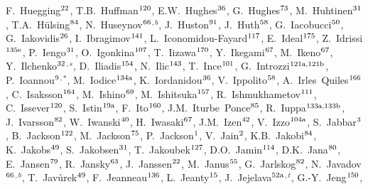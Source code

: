 \begin{flushleft}
F.~Huegging$^\textrm{\scriptsize 22}$,
T.B.~Huffman$^\textrm{\scriptsize 120}$,
E.W.~Hughes$^\textrm{\scriptsize 36}$,
G.~Hughes$^\textrm{\scriptsize 73}$,
M.~Huhtinen$^\textrm{\scriptsize 31}$,
T.A.~H\"ulsing$^\textrm{\scriptsize 84}$,
N.~Huseynov$^\textrm{\scriptsize 66}$$^{,b}$,
J.~Huston$^\textrm{\scriptsize 91}$,
J.~Huth$^\textrm{\scriptsize 58}$,
G.~Iacobucci$^\textrm{\scriptsize 50}$,
G.~Iakovidis$^\textrm{\scriptsize 26}$,
I.~Ibragimov$^\textrm{\scriptsize 141}$,
L.~Iconomidou-Fayard$^\textrm{\scriptsize 117}$,
E.~Ideal$^\textrm{\scriptsize 175}$,
Z.~Idrissi$^\textrm{\scriptsize 135e}$,
P.~Iengo$^\textrm{\scriptsize 31}$,
O.~Igonkina$^\textrm{\scriptsize 107}$,
T.~Iizawa$^\textrm{\scriptsize 170}$,
Y.~Ikegami$^\textrm{\scriptsize 67}$,
M.~Ikeno$^\textrm{\scriptsize 67}$,
Y.~Ilchenko$^\textrm{\scriptsize 32}$$^{,s}$,
D.~Iliadis$^\textrm{\scriptsize 154}$,
N.~Ilic$^\textrm{\scriptsize 143}$,
T.~Ince$^\textrm{\scriptsize 101}$,
G.~Introzzi$^\textrm{\scriptsize 121a,121b}$,
P.~Ioannou$^\textrm{\scriptsize 9}$$^{,*}$,
M.~Iodice$^\textrm{\scriptsize 134a}$,
K.~Iordanidou$^\textrm{\scriptsize 36}$,
V.~Ippolito$^\textrm{\scriptsize 58}$,
A.~Irles~Quiles$^\textrm{\scriptsize 166}$,
C.~Isaksson$^\textrm{\scriptsize 164}$,
M.~Ishino$^\textrm{\scriptsize 69}$,
M.~Ishitsuka$^\textrm{\scriptsize 157}$,
R.~Ishmukhametov$^\textrm{\scriptsize 111}$,
C.~Issever$^\textrm{\scriptsize 120}$,
S.~Istin$^\textrm{\scriptsize 19a}$,
F.~Ito$^\textrm{\scriptsize 160}$,
J.M.~Iturbe~Ponce$^\textrm{\scriptsize 85}$,
R.~Iuppa$^\textrm{\scriptsize 133a,133b}$,
J.~Ivarsson$^\textrm{\scriptsize 82}$,
W.~Iwanski$^\textrm{\scriptsize 40}$,
H.~Iwasaki$^\textrm{\scriptsize 67}$,
J.M.~Izen$^\textrm{\scriptsize 42}$,
V.~Izzo$^\textrm{\scriptsize 104a}$,
S.~Jabbar$^\textrm{\scriptsize 3}$,
B.~Jackson$^\textrm{\scriptsize 122}$,
M.~Jackson$^\textrm{\scriptsize 75}$,
P.~Jackson$^\textrm{\scriptsize 1}$,
V.~Jain$^\textrm{\scriptsize 2}$,
K.B.~Jakobi$^\textrm{\scriptsize 84}$,
K.~Jakobs$^\textrm{\scriptsize 49}$,
S.~Jakobsen$^\textrm{\scriptsize 31}$,
T.~Jakoubek$^\textrm{\scriptsize 127}$,
D.O.~Jamin$^\textrm{\scriptsize 114}$,
D.K.~Jana$^\textrm{\scriptsize 80}$,
E.~Jansen$^\textrm{\scriptsize 79}$,
R.~Jansky$^\textrm{\scriptsize 63}$,
J.~Janssen$^\textrm{\scriptsize 22}$,
M.~Janus$^\textrm{\scriptsize 55}$,
G.~Jarlskog$^\textrm{\scriptsize 82}$,
N.~Javadov$^\textrm{\scriptsize 66}$$^{,b}$,
T.~Jav\r{u}rek$^\textrm{\scriptsize 49}$,
F.~Jeanneau$^\textrm{\scriptsize 136}$,
L.~Jeanty$^\textrm{\scriptsize 15}$,
J.~Jejelava$^\textrm{\scriptsize 52a}$$^{,t}$,
G.-Y.~Jeng$^\textrm{\scriptsize 150}$,
$$
\end{flushleft}
